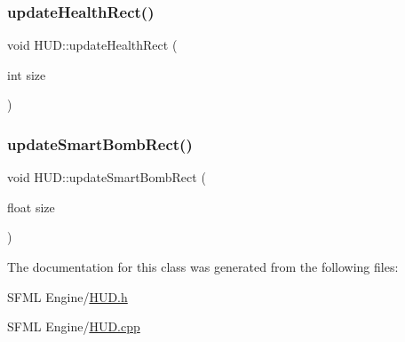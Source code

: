 \mbox{\label{class_h_u_d_a6112a6edad58595a45c8f63f354615ee}} 
\subsubsection{\texorpdfstring{update\+Health\+Rect()}{updateHealthRect()}}
{\footnotesize\ttfamily void H\+U\+D\+::update\+Health\+Rect (\begin{DoxyParamCaption}\item[{int}]{size }\end{DoxyParamCaption})}

\mbox{\label{class_h_u_d_a44b111c7f1f1c246203bd87f4ebff786}} 
\subsubsection{\texorpdfstring{update\+Smart\+Bomb\+Rect()}{updateSmartBombRect()}}
{\footnotesize\ttfamily void H\+U\+D\+::update\+Smart\+Bomb\+Rect (\begin{DoxyParamCaption}\item[{float}]{size }\end{DoxyParamCaption})}



The documentation for this class was generated from the following files\+:\begin{DoxyCompactItemize}
\item 
S\+F\+M\+L Engine/\hyperlink{_h_u_d_8h}{H\+U\+D.\+h}\item 
S\+F\+M\+L Engine/\hyperlink{_h_u_d_8cpp}{H\+U\+D.\+cpp}\end{DoxyCompactItemize}
